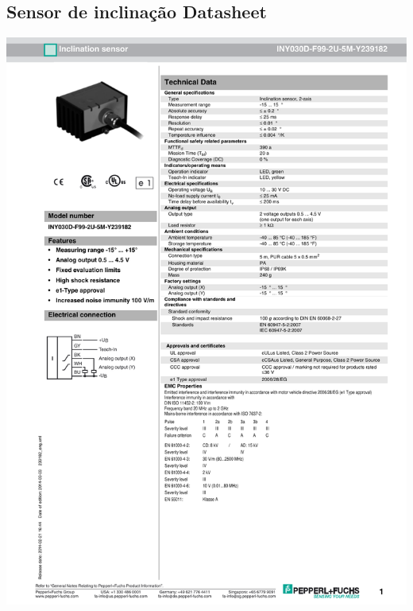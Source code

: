 \begin{appendices}
\subsection{Sensor de inclinação Datasheet}
\includegraphics[width=1\columnwidth]{figs/datasheets/inclinacao.pdf}


\end{appendices}
